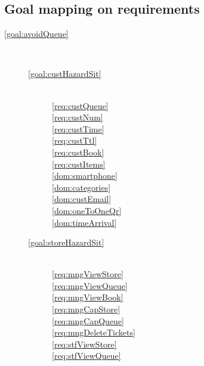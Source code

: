     \subsection{Goal mapping on requirements}

    \begin{description}
        \item[\ref{goal:avoidQueue}]  ~\\

        \begin{description}
            \item[\ref{goal:custHazardSit}]  ~\\

            \ref{req:custQueue}  ~\\
            \ref{req:custNum}  ~\\
            \ref{req:custTime}  ~\\
            \ref{req:custTtl}  ~\\
            \ref{req:custBook}  ~\\
            \ref{req:custItems}  ~\\

            \ref{dom:smartphone}  ~\\
            \ref{dom:categories}  ~\\
            \ref{dom:custEmail}  ~\\
            \ref{dom:oneToOneQr}  ~\\
            \ref{dom:timeArrival}  ~\\


            \item[\ref{goal:storeHazardSit}]  ~\\

            \ref{req:mngViewStore}  ~\\
            \ref{req:mngViewQueue}  ~\\
            \ref{req:mngViewBook}  ~\\
            \ref{req:mngCapStore}  ~\\
            \ref{req:mngCapQueue}  ~\\
            \ref{req:mngDeleteTickets}  ~\\
            \ref{req:stfViewStore}  ~\\
            \ref{req:stfViewQueue}  ~\\


\end{description}
\end{description}
